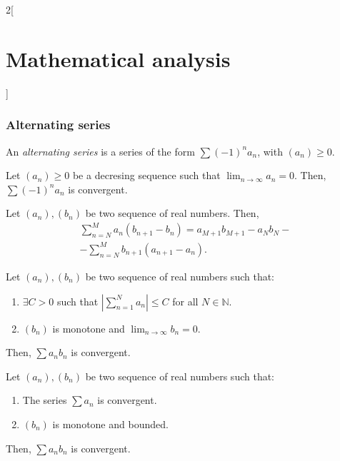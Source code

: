 \documentclass[class=article,crop=false]{standalone}
\begin{document}
\begin{multicols}{2}[\section{Mathematical analysis}]
\subsubsection{Alternating series}
\begin{definition}
An \textit{alternating series} is a series of the form $\sum (-1)^na_n$, with $(a_n)\geq 0$.
\end{definition}
\begin{theorem}
Let $(a_n)\geq 0$ be a decresing sequence such that $\displaystyle\lim_{n\to\infty}a_n=0$. Then, $\sum (-1)^na_n$ is convergent.
\end{theorem}
\begin{theorem}
Let $(a_n),(b_n)$ be two sequence of real numbers. Then, 
\begin{multline*}
\sum_{n=N}^M a_n(b_{n+1}-b_n)=a_{M+1}b_{M+1}-a_Nb_N-\\
-\sum_{n=N}^Mb_{n+1}(a_{n+1}-a_n).
\end{multline*}
\end{theorem}
\begin{theorem}
Let $(a_n),(b_n)$ be two sequence of real numbers such that:
\begin{enumerate}
    \item $\exists C>0$ such that $\displaystyle\left|\sum_{n=1}^Na_n\right|\leq C$ for all $N\in\mathbb{N}$.
    \item $(b_n)$ is monotone and $\displaystyle\lim_{n\to\infty}b_n=0$.
\end{enumerate}
Then, $\sum a_nb_n$ is convergent.
\end{theorem}
\begin{theorem}
Let $(a_n),(b_n)$ be two sequence of real numbers such that:
\begin{enumerate}
    \item The series $\sum a_n$ is convergent.
    \item $(b_n)$ is monotone and bounded.
\end{enumerate}
Then, $\sum a_nb_n$ is convergent.
\end{theorem}

\end{multicols}
\end{document}
